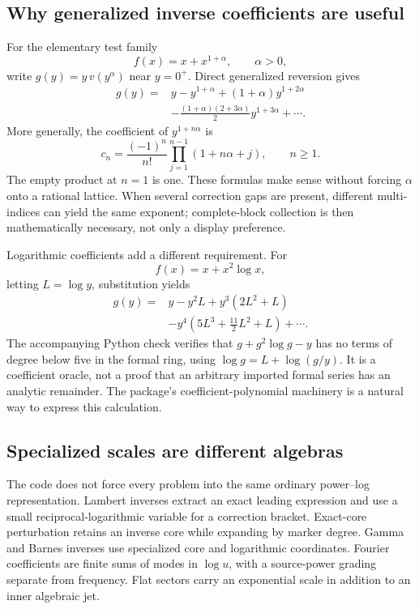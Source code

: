 \documentclass[11pt,letterpaper]{article}
\begin{document}
\subsection{Why generalized inverse coefficients are useful}

For the elementary test family
\[
 f(x)=x+x^{1+\alpha},\qquad \alpha>0,
\]
write $g(y)=y\,v(y^\alpha)$ near $y=0^+$. Direct generalized reversion gives
\begin{align*}
 g(y)={}&y-y^{1+\alpha}+(1+\alpha)y^{1+2\alpha}\\
 &-\frac{(1+\alpha)(2+3\alpha)}2y^{1+3\alpha}+\cdots.
\end{align*}
More generally, the coefficient of $y^{1+n\alpha}$ is
\[
 c_n=\frac{(-1)^n}{n!}\prod_{j=1}^{n-1}(1+n\alpha+j),\qquad n\ge1.
\]
The empty product at $n=1$ is one. These formulas make sense without forcing $\alpha$ onto a rational lattice. When several correction gaps are present, different multi-indices can yield the same exponent; complete-block collection is then mathematically necessary, not only a display preference.

Logarithmic coefficients add a different requirement. For
\[
 f(x)=x+x^2\log x,
\]
letting $L=\log y$, substitution yields
\begin{align*}
 g(y)={}&y-y^2L+y^3(2L^2+L)\\
 &-y^4\left(5L^3+\frac{11}{2}L^2+L\right)+\cdots.
\end{align*}
The accompanying Python check verifies that $g+g^2\log g-y$ has no terms of degree below five in the formal ring, using $\log g=L+\log(g/y)$. It is a coefficient oracle, not a proof that an arbitrary imported formal series has an analytic remainder. The package's coefficient-polynomial machinery is a natural way to express this calculation.

\subsection{Specialized scales are different algebras}

The code does not force every problem into the same ordinary power--log representation. Lambert inverses extract an exact leading expression and use a small reciprocal-logarithmic variable for a correction bracket. Exact-core perturbation retains an inverse core while expanding by marker degree. Gamma and Barnes inverses use specialized core and logarithmic coordinates. Fourier coefficients are finite sums of modes in $\log u$, with a source-power grading separate from frequency. Flat sectors carry an exponential scale in addition to an inner algebraic jet.~\cite{lambert,corepert,fourier,modules}
\end{document}
